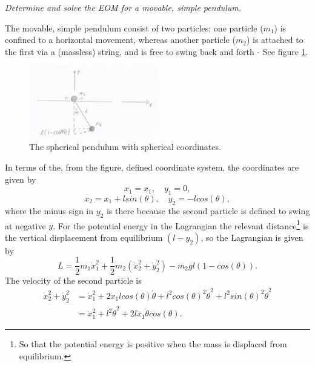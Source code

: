 \begin{example}
	\emph{Determine and solve the EOM for a movable, simple pendulum.}\newline
	
	The movable, simple pendulum consist of two particles; one particle ($m_1$) is confined to a horizontal movement, whereas another particle ($m_2$) is attached to the first via a (massless) string, and is free to swing back and forth - See figure \ref{fig:sphere}.
	\begin{figure}[h]
		\captionsetup{width=1\textwidth}
		\centering
		\includegraphics[width=0.5\textwidth]{figures/sphere}
		\caption{The spherical pendulum with spherical coordinates.}
		\label{fig:sphere}
	\end{figure}
	In terms of the, from the figure, defined coordinate system, the coordinates are given by
	\begin{equation}
		x_1=x_1, \quad y_1=0,
	\end{equation} 
	\begin{equation}
		x_2=x_1+lsin(\theta), \quad y_2=-lcos(\theta),
	\end{equation} 
	where the minus sign in $y_2$ is there because the second particle is defined to swing at negative $y$. For the potential energy in the Lagrangian the relevant distance\footnote{So that the potential energy is positive when the mass is displaced from equilibrium.} is the vertical displacement from equilibrium $(l-y_2)$, so the Lagrangian is given by
	\begin{equation}
		L=\frac{1}{2}m_1\dot{x}_1^2+\frac{1}{2}m_2(\dot{x}_2^2+\dot{y}_2^2)-m_2gl(1-cos(\theta)).
	\end{equation} 
	The velocity of the second particle is
	\begin{equation}
		\begin{split}
			\dot{x}_2^2+\dot{y}_2^2&=\dot{x}_1^2+2\dot{x}_1lcos(\theta)\dot{\theta}+l^2cos(\theta)^2\dot{\theta}^2+l^2sin(\theta)^2\dot{\theta}^2\\
			&=\dot{x}_1^2+l^2\dot{\theta}^2+2l\dot{x}_1\dot{\theta}cos(\theta).
		\end{split}
	\end{equation} 

\end{example}

